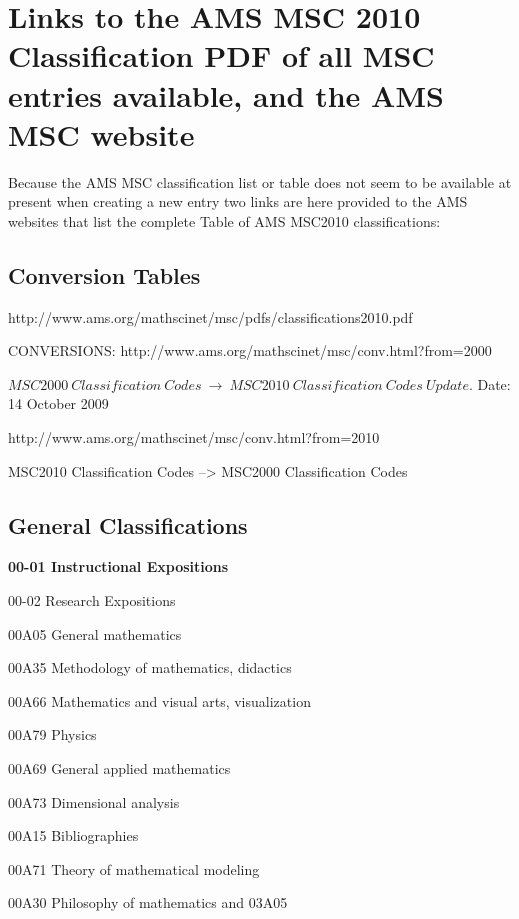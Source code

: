 \documentclass[12pt]{article}
\theoremstyle{plain}
\theoremstyle{definition}
\numberwithin{equation}{section}
\begin{document}
\section{Links to the AMS MSC 2010 Classification PDF of all MSC entries available, and the AMS MSC website}
Because the AMS MSC classification list or table does not seem to be available at present when creating a new entry two links are here provided to the AMS websites that list the complete Table of AMS MSC2010 classifications:




\subsection{Conversion Tables}

http://www.ams.org/mathscinet/msc/pdfs/classifications2010.pdf

CONVERSIONS: http://www.ams.org/mathscinet/msc/conv.html?from=2000 


$MSC2000~ Classification~ Codes~ \to  ~MSC2010~ Classification~ Codes ~Update.$
Date: 14 October 2009


http://www.ams.org/mathscinet/msc/conv.html?from=2010

MSC2010 Classification Codes --> MSC2000 Classification Codes


\subsection{General Classifications}
{\bf 00-01 Instructional Expositions}

00-02 Research Expositions

00A05 General mathematics

00A35 Methodology of mathematics, didactics

00A66 Mathematics and visual arts, visualization

00A79 Physics 

00A69 General applied mathematics

00A73 Dimensional analysis

00A15 Bibliographies

00A71 Theory of mathematical modeling 

00A30 Philosophy of mathematics and 03A05
\end{document}
